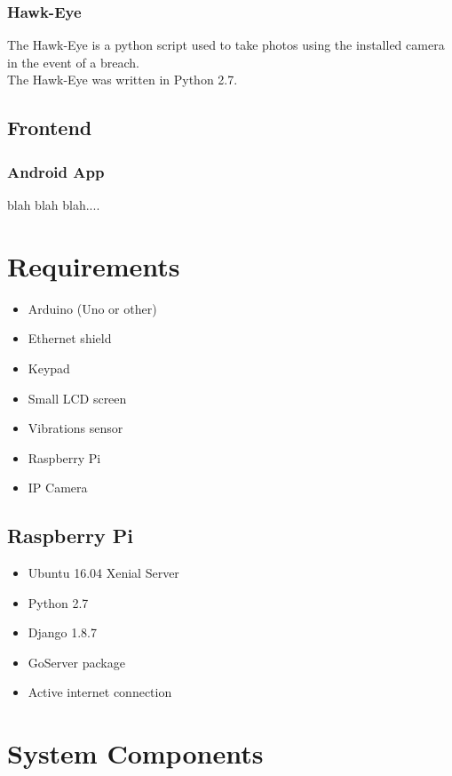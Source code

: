 \documentclass[10pt]{article}
\begin{document}
\quad \subsubsection*{Hawk-Eye}
\quad The Hawk-Eye is a python script used to take photos using the installed camera in the event of a breach. \\
\quad The Hawk-Eye was written in Python 2.7.


\subsection{Frontend}
\subsubsection{Android App}
blah blah blah....

\section{Requirements}
\begin{itemize}
	\item Arduino (Uno or other)
	\item Ethernet shield
	\item Keypad
	\item Small LCD screen
	\item Vibrations sensor
	\item Raspberry Pi
	\item IP Camera
\end{itemize}
\subsection{Raspberry Pi}
\begin{itemize}
	\item Ubuntu 16.04 Xenial Server
	\item Python 2.7	
	\item Django 1.8.7
	\item GoServer package
	\item Active internet connection
\end{itemize}

\section{System Components}
\end{document}
